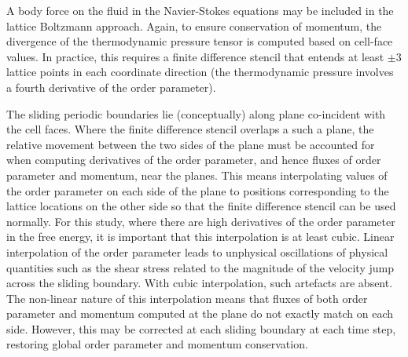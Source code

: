 \documentclass[8.5pt,twoside,twocolumn]{article}
\begin{document}
A body force on the fluid in the Navier-Stokes equations may be
included in the lattice Boltzmann approach. Again, to ensure conservation
of momentum, the divergence of the thermodynamic pressure tensor is
computed based on cell-face values. In practice, this requires a
finite difference stencil
that entends at least $\pm 3$ lattice points in each coordinate direction
(the thermodynamic pressure involves a fourth derivative of the order
parameter).

The sliding periodic boundaries lie (conceptually) along plane
co-incident with the cell faces. Where the finite difference stencil 
overlaps a such a plane, the relative movement between the two sides
of the plane must be accounted for when computing derivatives of the
order parameter, and hence fluxes of order parameter and momentum,
near the planes. This means interpolating values of the order parameter
on each side of the plane to positions corresponding to the lattice
locations on the other side so that the finite difference stencil
can be used normally. For this study, where there are high derivatives
of the order parameter in the free energy, it is important that this
interpolation is at least cubic. Linear interpolation of the order
parameter leads to unphysical oscillations of physical quantities
such as the shear stress related to the magnitude of the velocity jump
across the sliding boundary.
With cubic interpolation, such artefacts are absent. The non-linear
nature of this interpolation means that fluxes of both order parameter
and momentum computed at the plane do not exactly match on each side.
However, this may be corrected at each sliding boundary at each time
step, restoring global order parameter and momentum conservation.



\footnotesize{
}
\end{document}
